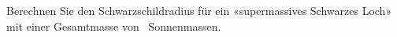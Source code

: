 Berechnen Sie den Schwarzschildradius für ein «supermassives Schwarzes Loch» mit einer Gesamtmasse von \nSoO\ Sonnenmassen.
